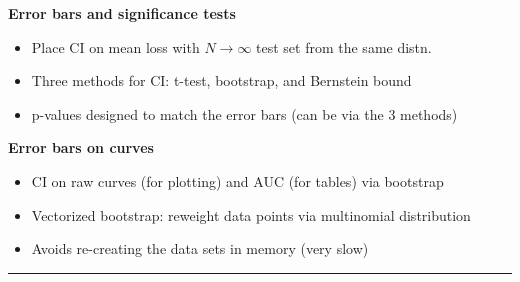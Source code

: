\documentclass[a0,landscape]{a0poster}
\newcommand{\sectionx}{\textbf}
\begin{document}
\begin{multicols}{3}
\sectionx{Error bars and significance tests}
\begin{itemize}
  \item Place CI on mean loss with $N \rightarrow \infty$ test set from the same distn.
  \item Three methods for CI: t-test, bootstrap, and Bernstein bound
  \item p-values designed to match the error bars (can be via the 3 methods)
\end{itemize}

\sectionx{Error bars on curves}
\begin{itemize}
  \item CI on raw curves (for plotting) and AUC (for tables) via bootstrap
  \item Vectorized bootstrap: reweight data points via multinomial distribution
  \item Avoids re-creating the data sets in memory (very slow)
\end{itemize}

\end{multicols}

\vspace{5mm}
\hrule
\vspace{5mm}
\end{document}
